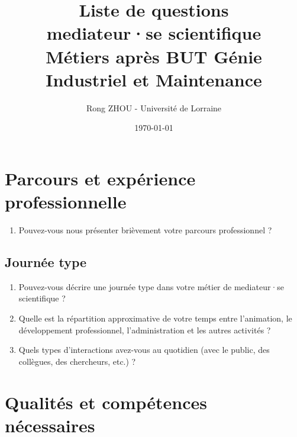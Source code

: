 \documentclass[a4paper,11pt]{article}
\begin{document}
\title{\textbf{Liste de questions} \\
\large mediateur·se scientifique \\
\normalsize Métiers après BUT Génie Industriel et Maintenance}
\author{Rong ZHOU - Université de Lorraine}
\date{\today}

\maketitle

\vspace{0.5cm}

\section{Parcours et expérience professionnelle}

\begin{enumerate}[leftmargin=*]

    \item Pouvez-vous nous présenter brièvement votre parcours professionnel ?

\end{enumerate}

\subsection{Journée type}

\begin{enumerate}[leftmargin=*]
    \item Pouvez-vous décrire une journée type dans votre métier de mediateur·se scientifique ?

    \item Quelle est la répartition approximative de votre temps entre l'animation, le développement professionnel, l'administration et les autres activités ?

    \item Quels types d'interactions avez-vous au quotidien (avec le public, des collègues, des chercheurs, etc.) ?
\end{enumerate}

\section{Qualités et compétences nécessaires}
\end{document}
